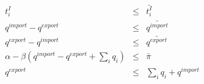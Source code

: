 \documentclass{article}
\begin{document}
\begin{eqnarray} t_i^{I} &\leq& \bar{t_i^{I}}\\ q^{import} - q^{export} &\leq& \bar{q^{import}}\\ q^{export} - q^{import} &\leq& \bar{q^{export}}\\ \alpha - \beta\left(q^{import} - q^{export} + \sum_i q_i \right) &\leq& \bar{\pi}\\ q^{export} &\leq& \sum_i q_i +q^{import} \end{eqnarray}
\pagebreak
\end{document}
